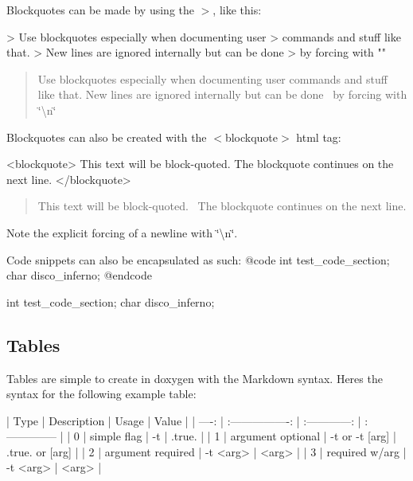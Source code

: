 Blockquotes can be made by using the $>$, like this\+: \begin{DoxyVerb} > Use blockquotes especially when documenting user
 > commands and stuff like that.
 > New lines are ignored internally but can be done\n
 > by forcing with "\n"
\end{DoxyVerb}


\begin{quote}
Use blockquotes especially when documenting user commands and stuff like that. New lines are ignored internally but can be done~\newline
by forcing with \char`\"{}\textbackslash{}n\char`\"{} \end{quote}


Blockquotes can also be created with the $<$blockquote$>$ html tag\+: \begin{DoxyVerb}  <blockquote>
  This text will be block-quoted.\n
  The blockquote continues on the next line.
  </blockquote>
\end{DoxyVerb}


\begin{quote}
This text will be block-\/quoted.~\newline
The blockquote continues on the next line. \end{quote}


Note the explicit forcing of a newline with \char`\"{}\textbackslash{}n\char`\"{}.

Code snippets can also be encapsulated as such\+: @code int test\+\_\+code\+\_\+section; char disco\+\_\+inferno; @endcode


\begin{DoxyCode}
\textcolor{keywordtype}{int} test\_code\_section;
\textcolor{keywordtype}{char} disco\_inferno;
\end{DoxyCode}


\subsection*{Tables }

Tables are simple to create in doxygen with the Markdown syntax. Here\textquotesingle{}s the syntax for the following example table\+: \begin{DoxyVerb}   | Type  |     Description    |      Usage     |    Value        |
   | ----: | :----------------: | :------------: | :-------------- |
   |  0    | simple flag        | -t             | .true.          |
   |  1    | argument optional  | -t or -t [arg] | .true. or [arg] |
   |  2    | argument required  | -t <arg>       | <arg>           |
   |  3    | required w/arg     | -t <arg>       | <arg>           |
\end{DoxyVerb}


